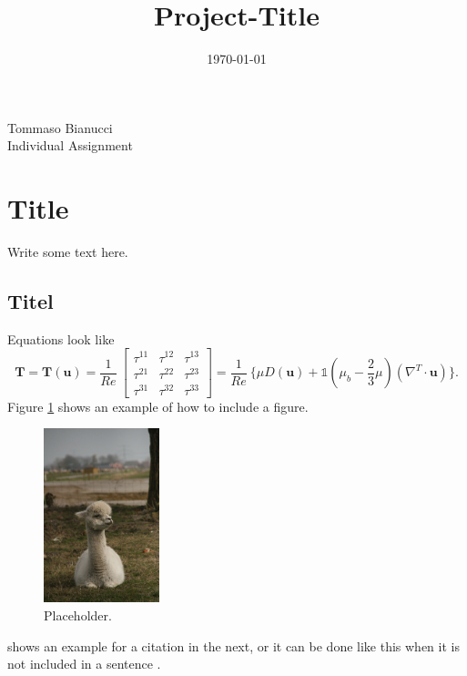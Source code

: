 \documentclass[11pt,a4paper,DIV12,pdftex]{scrartcl}
\title{Project-Title}
\date{\vspace*{-1cm}\today}
\author{}
\begin{document}
\maketitle
\begin{center}
	Tommaso Bianucci \\ Individual Assignment
\end{center}

\section{Title}
Write some text here.

\subsection{Titel}
Equations look like
\begin{equation}
\mathbf{T} = \mathbf{T}(\mathbf{u})= \frac{1}{Re}\ \begin{bmatrix} \tau^{11} & \tau^{12} &\tau^{13}\\ 
\tau^{21} & \tau^{22} &\tau^{23}\\
 \tau^{31} & \tau^{32} &\tau^{33}\end{bmatrix}= \frac{1}{Re}\ \{  \mu D(\mathbf{u}) +  \mathbb{1} \left( \mu_{b} - \frac{2}{3} \mu \right)(\nabla^T \cdot \mathbf{u}) \}.
\end{equation}
Figure \ref{fig:placeholder} shows an example of how to include a figure.
\begin{figure}[!ht]
\centering
  \includegraphics[width=0.3\textwidth]{Figures/placeholder.jpg}
  \caption{Placeholder.} 
  \label{fig:placeholder}
\end{figure}
\cite{jones2001taxonomy} shows an example for a citation in the next, or it can be done like this when it is not included in a sentence \citep{jones2001taxonomy}.




\end{document}

